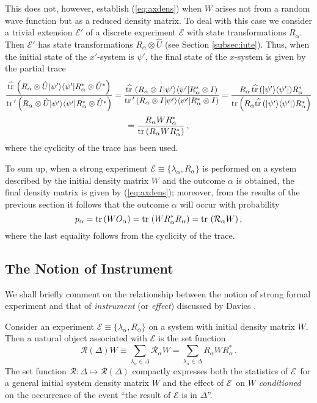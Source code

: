 \documentclass[12pt]{article}
\newcommand{\eq}[1]{(\ref{#1})}
\renewcommand{\dagger}{\ast}
\newcommand{\tr}{\mbox{${\rm tr}\,$}}
\renewcommand{\a}{\alpha}
\newcommand{\la}{\lambda_{\a}}
\newcommand{\ot}{\otimes}
\newcommand{\Aa}{R_{\a}}
\newcommand{\Aad}{R^{\dagger}_{\a}}
\newcommand{\E}{\mbox{$\mathscr{E}$}}
\newcommand{\Ex}{\mbox{$\mathcal{E}$}}
\begin{document}
This does not, however, establish \eq{eq:axdens} when $W$ arises not
{}from a random wave function but as a reduced density matrix. To deal
with this case we consider a trivial extension $\E'$ of a discrete
experiment \E{} with state transformations $\Aa$. Then $\E'$ has state
transformations $\Aa\ot \hat{U}$ (see Section \ref{subsec:iute}).
Thus, when the initial state of the $x'$-system is $\psi'$, the final
state of the $x$-system is given by the partial trace
$$
\frac{\widehat{\tr} \left(\Aa\otimes \hat{U}| \psi '\rangle \langle
     \psi' |\Aad\otimes \hat{U}^{*}\right)}{\tr'\left(\Aa\otimes
     \hat{U}| \psi '\rangle \langle \psi' |\Aad\otimes
     \hat{U}^{*}\right)} = \frac{\widehat{\tr} \left(\Aa\otimes I| \psi
     '\rangle \langle \psi' |\Aad\otimes I\right)}{\tr'
   \left(\Aa\otimes I| \psi '\rangle \langle \psi' |\Aad\otimes
     I\right)} =\frac{\Aa \, \widehat{\tr} (| \psi' \rangle \langle
   \psi '|) \Aad}{\tr\!\left(\Aa \widehat{\tr} (| \psi' \rangle \langle
     \psi '|) \Aad\right)}$$
$$= \frac{\Aa W \Aad}{\tr\!\left(\Aa W \Aad\right)} \, ,
$$
where the cyclicity of the trace has been used.


To sum up, when a strong experiment $\mathcal{E}\equiv\{\la, \Aa\}$ is
performed on a system described by the initial density matrix $W$ and
the outcome $\a$ is obtained, the final density matrix is given by
(\ref{eq:axdens}); moreover, {}from the results of the previous
section it follows that the outcome $\a$ will occur with probability
\begin{equation}
p_{\a}= \tr( W O_{\a})= \tr\left( W \Aad\Aa\right) = \tr\left(
\mathcal{R}_\a W \right),
\label{eq:pexdm}
\end{equation}
where the last equality follows {}from the cyclicity of the trace.

\subsection{The Notion of Instrument}

We shall briefly comment on the relationship between the notion of
strong formal experiment and that of \emph{instrument} (or
\emph{effect}) discussed by Davies \cite{Dav76}.

Consider an experiment $\mathcal{E}\equiv\{\la, \Aa\}$ on a system
with initial density matrix $W$.  Then a natural object associated
with $\Ex$ is the set function
\begin{equation}
\mathcal{R}(\Delta) W \equiv\sum_{\lambda_\alpha \in
\Delta}\mathcal{R}_\a W =\sum_{\la\in \Delta}\Aa W\Aad \, .
\label{eq:ins}
\end{equation}
The set function $\mathcal{R}: \Delta \mapsto \mathcal{R} (\Delta)$
compactly expresses both the statistics of \Ex\ for a general initial
system density matrix $W$ and the effect of \Ex\ on $W$
\emph{conditioned} on the occurrence of the event ``the result of
\Ex{} is in $\Delta$''.
\end{document}
